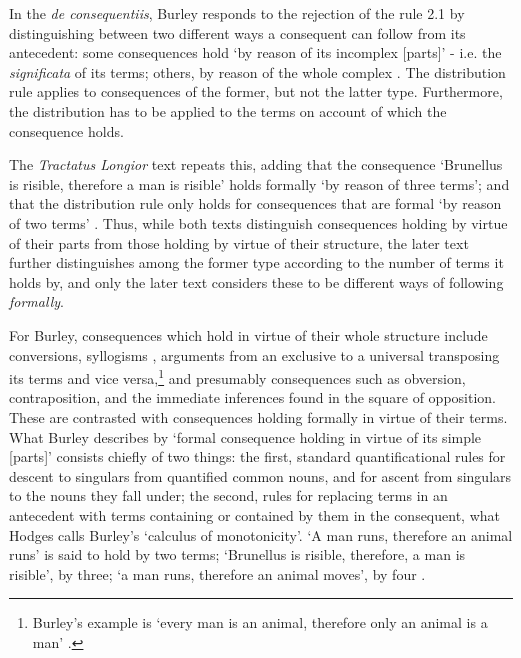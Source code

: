 	In the \textit{de consequentiis}, Burley responds to the rejection of the rule 2.1 by distinguishing between two different ways a consequent can follow from its antecedent: some consequences hold `by reason of its incomplex [parts]' - i.e. the \textit{significata} of its terms; others, by reason of the whole complex \autocite[p. 118, par. 31]{Green-Pedersen1980b}. The distribution rule applies to consequences of the former, but not the latter type. Furthermore, the distribution has to be applied to the terms on account of which the consequence holds. 
	
	The \textit{Tractatus Longior} text repeats this, adding that the consequence `Brunellus is risible, therefore a man is risible' holds formally `by reason of three terms'; and that the distribution rule only holds for consequences that are formal `by reason of two terms' \autocite[pp. 84.11-85.17]{BurleyDPAL}. Thus, while both texts distinguish consequences holding by virtue of their parts from those holding by virtue of their structure, the later text further distinguishes among the former type according to the number of terms it holds by, and only the later text considers these to be different ways of following \textit{formally}.
	
	For Burley, consequences which hold in virtue of their whole structure include conversions, syllogisms \autocite[p. 86.9-12]{BurleyDPAL}, arguments from an exclusive to a universal transposing its terms and vice versa,\footnote{Burley's example is `every man is an animal, therefore only an animal is a man' \autocite[pp. 142-143, par. 118]{Green-Pedersen1980b}.} and presumably consequences such as obversion, contraposition, and the immediate inferences found in the square of opposition. These are contrasted with consequences holding formally in virtue of their terms. What Burley describes by `formal consequence holding in virtue of its simple [parts]' consists chiefly of two things: the first, standard quantificational rules for descent to singulars from quantified common nouns, and for ascent from singulars to the nouns they fall under; the second, rules for replacing terms in an antecedent with terms containing or contained by them in the consequent, what Hodges calls Burley's `calculus of monotonicity'. `A man runs, therefore an animal runs' is said to hold by two terms; `Brunellus is risible, therefore, a man is risible', by three; `a man runs, therefore an animal moves', by four \autocite[p. 84.24-27]{BurleyDPAL}.
	
